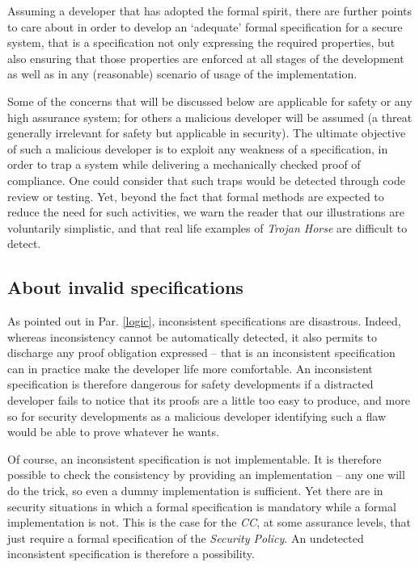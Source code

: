 \documentclass[conference]{IEEEtran}
\begin{document}
Assuming a developer that has adopted the formal spirit, there are further points to care about
in order to develop an `adequate' formal specification for a secure system, that is a
specification not only expressing the required properties, but also ensuring that those
properties are enforced at all stages of the development as well as in any (reasonable)
scenario of usage of the implementation.

Some of the concerns that will be discussed below are applicable for safety or any high
assurance system; for others a malicious developer will be assumed (a threat generally
irrelevant for safety but applicable in security). The ultimate objective of such a malicious
developer is to exploit any weakness of a specification, in order to trap a system while
delivering a mechanically checked proof of compliance. One could consider that such traps
would be detected through code review or testing. Yet, beyond the fact that formal methods are
expected to reduce the need for such activities, we warn the reader that our illustrations are
voluntarily simplistic, and that real life examples of \emph{Trojan Horse} are difficult to
detect.

\subsection{About invalid specifications}\label{invalid_spec}

As pointed out in Par. \ref{logic}, inconsistent specifications are disastrous. Indeed,
whereas inconsistency cannot be automatically detected, it also permits to discharge any proof
obligation expressed -- that is an inconsistent specification can in practice make the
developer life more comfortable. An inconsistent specification is therefore dangerous for
safety developments if a distracted developer fails to notice that its proofs are a little too
easy to produce, and more so for security developments as a malicious developer identifying
such a flaw would be able to prove whatever he wants.

Of course, an inconsistent specification is not implementable. It is therefore possible to
check the consistency by providing an implementation -- any one will do the trick, so even a
dummy implementation is sufficient. Yet there are in security situations in which a formal
specification is mandatory while a formal implementation is not. This is the case for the
\emph{CC}, at some assurance levels, that just require a formal specification of the
\emph{Security Policy}. An undetected inconsistent specification is therefore a possibility.
\end{document}
